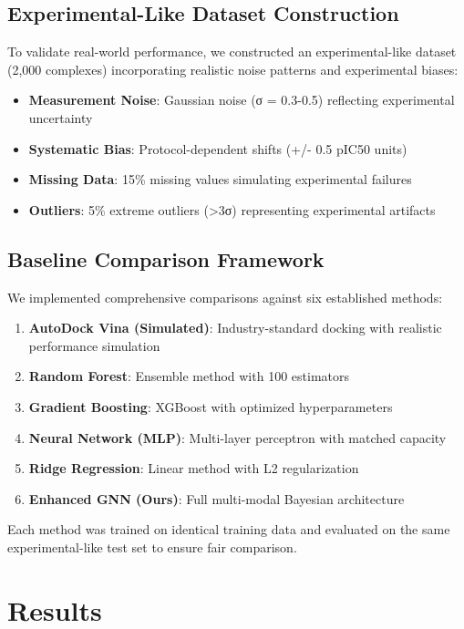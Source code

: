 \documentclass[11pt,a4paper]{article}
\begin{document}
\subsection{Experimental-Like Dataset Construction}

To validate real-world performance, we constructed an experimental-like dataset (2,000 complexes) incorporating realistic noise patterns and experimental biases:

\begin{itemize}
    \item \textbf{Measurement Noise}: Gaussian noise (σ = 0.3-0.5) reflecting experimental uncertainty
    \item \textbf{Systematic Bias}: Protocol-dependent shifts (+/- 0.5 pIC50 units)
    \item \textbf{Missing Data}: 15\% missing values simulating experimental failures
    \item \textbf{Outliers}: 5\% extreme outliers (>3σ) representing experimental artifacts
\end{itemize}

\subsection{Baseline Comparison Framework}

We implemented comprehensive comparisons against six established methods:

\begin{enumerate}
    \item \textbf{AutoDock Vina (Simulated)}: Industry-standard docking with realistic performance simulation
    \item \textbf{Random Forest}: Ensemble method with 100 estimators
    \item \textbf{Gradient Boosting}: XGBoost with optimized hyperparameters
    \item \textbf{Neural Network (MLP)}: Multi-layer perceptron with matched capacity
    \item \textbf{Ridge Regression}: Linear method with L2 regularization
    \item \textbf{Enhanced GNN (Ours)}: Full multi-modal Bayesian architecture
\end{enumerate}

Each method was trained on identical training data and evaluated on the same experimental-like test set to ensure fair comparison.

\section{Results}
\end{document}
